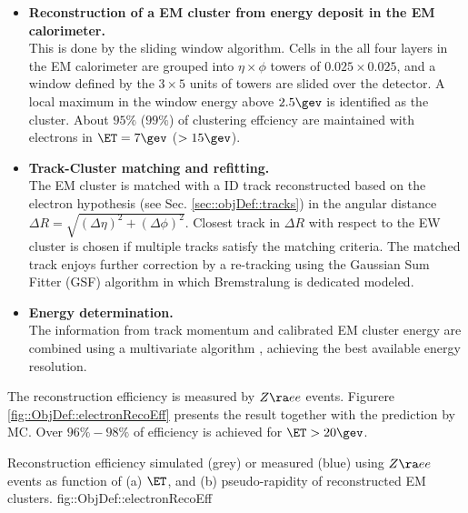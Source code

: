 \begin{itemize}
\item \textbf{Reconstruction of a EM cluster from energy deposit in the EM calorimeter.} \\
This is done by the sliding window algorithm. Cells in the all four layers in the EM calorimeter are grouped into $\eta\times\phi$ towers of $0.025\times0.025$, and a window defined by the $3\times5$ units of towers are slided over the detector. A local maximum in the window energy above $2.5\gev$ is identified as the cluster. About $95\%$ ($99\%$) of clustering effciency are maintained with electrons in $\ET=7 \gev$ ($>15 \gev$).

\item \textbf{Track-Cluster matching and refitting.} \\
The EM cluster is matched with a ID track reconstructed based on the electron hypothesis (see Sec. \ref{sec::objDef::tracks}) in the angular distance $\Delta R = \sqrt{(\Delta \eta)^2+(\Delta \phi)^2}$.
Closest track in $\Delta R$ with respect to the EW cluster is chosen if multiple tracks satisfy the matching criteria.
The matched track enjoys further correction by a re-tracking using the Gaussian Sum Fitter (GSF) \cite{158_GSF} algorithm in which Bremstralung is dedicated modeled.

\item \textbf{Energy determination.} \\
The information from track momentum and calibrated EM cluster energy are combined using a multivariate algorithm \cite{161_egammaCalibRun1}, 
achieving the best available energy resolution.
\end{itemize}

The reconstruction efficiency is measured by $Z\ra ee$ events. Figurere \ref{fig::ObjDef::electronRecoEff} presents the result together with the prediction by MC. Over $96\%-98\%$ of efficiency is achieved for $\ET>20\gev$.

{ Reconstruction efficiency simulated (grey) or measured (blue) using $Z\ra ee$ events \cite{156_ElectronEffMeas_2015data} as function of (a) $\ET$, and (b) pseudo-rapidity of reconstructed EM clusters.}
{fig::ObjDef::electronRecoEff}


